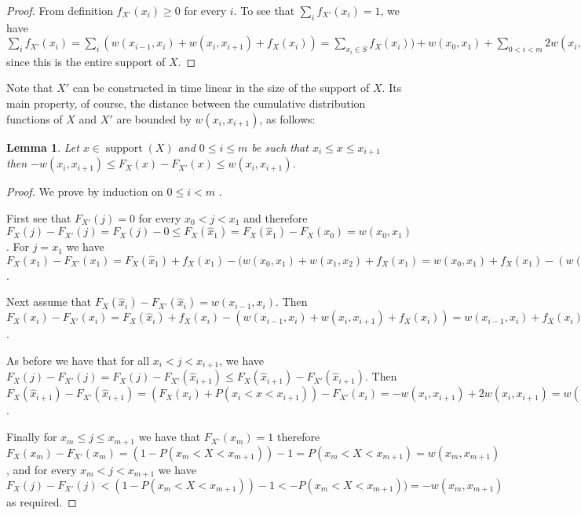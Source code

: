 \documentclass{article}
\newtheorem{lemma}[thm]{Lemma}
\DeclareMathOperator{\support}{support}
\begin{document}
	\begin{proof}
		From definition $f_{X'}(x_{i})\geq 0$ for every $i$. To see that $\sum_i f_{X'}(x_{i}) =1$, 
		we have $\sum_i f_{X'}(x_{i}) = \sum_i (w(x_{i-1},x_i) + w(x_i,x_{i+1}) + f_{X}(x_i)) = 	
		\sum _{x_i\in S} f_{X}(x_i)) + w(x_0,x_1)+ \sum_{0 < i < m} 2 w(x_i,x_{i+1}) + w(x_m,x_{m+1}) = 
		\sum _{x_i\in S} P(X{=}x_i) + P(x_0 {<} X {<} x_1)+ \sum_{0 < i < m} P(x_i < X < x_{i+1}) +P(x_m < X < x_{m+1}) = 1$ since this is the entire support of $X$.	
	\end{proof}
	
	
	Note that $X'$ can be constructed in time linear in the size of the support of $X$. %
	Its main property, of course, the distance between the cumulative distribution functions of $X$ and $X'$ are bounded by $w(x_i,x_{i+1})$, as follows:
	\begin{lemma}\label{lem:balance}
		Let $x\in\support(X)$ and $0\leq i\leq m$ be such that $x_i\leq x \leq x_{i+1}$ then $-w(x_i,x_{i+1})\leq F_X(x)-F_{X'}(x)\leq  w(x_i,x_{i+1})$.
	\end{lemma}
	
	\begin{proof}	
		
		We prove by induction on $0\leq i < m$ .
		
		First see that $F_{X'}(j) = 0$  for every $x_0<j < x_1$ and therefore $F_X(j)-F_{X'}(j) = F_X(j)-0 \leq F_X(\hat x_1)= F_X(\hat x_1)- F_X(x_0) = w(x_0,x_1)$. For $ j = x_1$ we have $F_X(x_1)-F_{X'}(x_1)=  F_X(\hat x_1) +f_{X}(x_1) - (w(x_0,x_1) + w(x_1,x_2) + f_{X}(x_1) = 
		w(x_0,x_1) +f_{X}(x_1) - (w(x_0,x_1) + w(x_1,x_2) + f_{X}(x_1)) = -w(x_1,x_2)$.
		
		Next assume that $F_X(\hat x_i)-F_{X'}(\hat x_i) = w(x_{i-1},x_i)$.
		Then $F_X(x_i)-F_{X'}(x_i) =  F_X(\hat x_i) +f_{X}(x_i) - (w(x_{i-1},x_i) + w(x_i,x_{i+1}) + f_{X}(x_i)) =  w(x_{i-1},x_i) +f_{X}(x_{i}) - (w(x_{i-1},x_i) + w(x_{i},x_{i+1}) + f_{X}(x_{i})) = -w(x_{i},x_{i+1})$.
		
		As before we have that for all $x_i< j< x_{i+1}$, we have $F_X(j)-F_{X'}(j) = F_X(j)-F_{X'}(\hat x_{i+1}) \leq  F_X(\hat x_{i+1})-F_{X'}(\hat x_{i+1})$. Then $F_X(\hat x_{i+1})-F_{X'}(\hat x_{i+1}) = (F_X(x_i)+ P(x_i < x <x_{i+1})) - F_{X'}(x_i) = -w(x_{i},x_{i+1}) + 2w(x_{i},x_{i+1}) = w(x_{i},x_{i+1}) $.
		
		
		Finally for $x_m\leq j \leq x_{m+1}$ we have that $F_{X'}(x_m)=1$ therefore $F_X(x_m)-F_{X'}(x_m) = (1- P(x_m<X < x_{m+1})) - 1 =  P(x_m<X < x_{m+1}) = w(x_m,x_{m+1})$, and for every $x_m<j<x_{m+1}$ we have $F_X(j) - F_{X'}(j) < (1- P(x_m<X < x_{m+1})) - 1 <  - P(x_m<X < x_{m+1}))  = -w(x_m,x_{m+1})$ as required.
	\end{proof}
	
\end{document}
